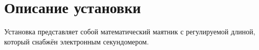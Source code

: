 \section{Описание установки}

Установка представляет собой математический маятник с регулируемой длиной, который снабжён электронным секундомером.